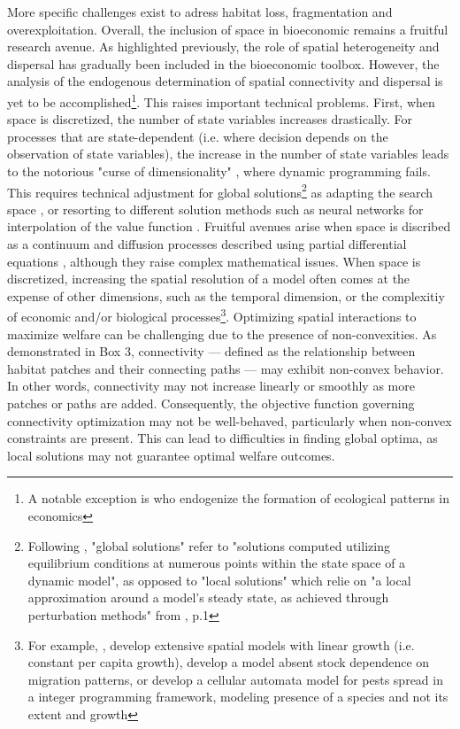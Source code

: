 More specific challenges exist to adress habitat loss, fragmentation and overexploitation. Overall, the inclusion of space in bioeconomic remains a fruitful research avenue. As highlighted previously, the role of spatial heterogeneity and dispersal has gradually been included in the bioeconomic toolbox. However, the analysis of the endogenous determination of spatial connectivity and dispersal is yet to be accomplished\footnote{A notable exception is \cite{brock_pattern_2010} who endogenize the formation of ecological patterns in economics}. This raises important technical problems. First, when space is discretized, the number of state variables increases drastically. For processes that are state-dependent (i.e. where decision depends on the observation of state variables), the increase in the number of state variables leads to the notorious "curse of dimensionality" \citep{Bellman}, where dynamic programming fails. This requires technical adjustment for global solutions\footnote{Following \cite{brumm_adaptive_2017}, "global solutions" refer to "solutions computed utilizing equilibrium conditions at numerous points within the state space of a dynamic model", as opposed to "local solutions" which relie on "a local approximation around a model's steady state, as achieved through perturbation methods" from \cite{friedl_deep_2023}, p.1} as adapting the search space \citep{brumm_adaptive_2017}, or resorting to different solution methods such as neural networks for interpolation of the value function \citep{friedl_deep_2023}. Fruitful avenues arise when space is discribed as a continuum and diffusion processes described using partial differential equations \citep{brock_pattern_2010, brock_2020}, although they raise complex mathematical issues. When space is discretized, increasing the spatial resolution of a model often comes at the expense of other dimensions, such as the temporal dimension, or the complexitiy of economic and/or biological processes\footnote{For example, \cite{blackwood_cost-effective_2010}, \cite{fabbri_competition_2022} develop extensive spatial models with linear growth (i.e. constant per capita growth),  \cite{costello_optimal_2008} develop a model absent stock dependence on migration patterns, or \cite{Wilen2012} develop a cellular automata model for pests spread in a integer programming framework, modeling presence of a species and not its extent and growth}. Optimizing spatial interactions to maximize welfare can be challenging due to the presence of non-convexities. As demonstrated in Box 3, connectivity — defined as the relationship between habitat patches and their connecting paths — may exhibit non-convex behavior. In other words, connectivity may not increase linearly or smoothly as more patches or paths are added. Consequently, the objective function governing connectivity optimization may not be well-behaved, particularly when non-convex constraints are present. This can lead to difficulties in finding global optima, as local solutions may not guarantee optimal welfare outcomes. 
